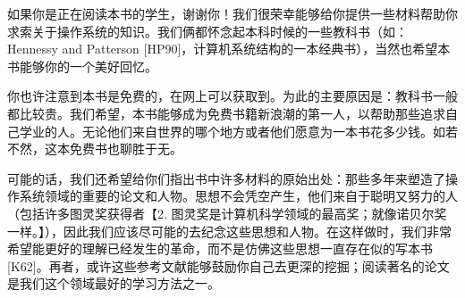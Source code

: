 \vspace*{0.0cm}
\thispagestyle{empty}
\centerline{}\vspace{2cm}

如果你是正在阅读本书的学生，谢谢你！我们很荣幸能够给你提供一些材料帮助你求索关于操作系统的知识。我们俩都怀念起本科时候的一些教科书（如：Hennessy and Patterson [HP90]，计算机系统结构的一本经典书），当然也希望本书能够你的一个美好回忆。

你也许注意到本书是免费的，在网上可以获取到。为此的主要原因是：教科书一般都比较贵。我们希望，本书能够成为免费书籍新浪潮的第一人，以帮助那些追求自己学业的人。无论他们来自世界的哪个地方或者他们愿意为一本书花多少钱。如若不然，这本免费书也聊胜于无。

可能的话，我们还希望给你们指出书中许多材料的原始出处：那些多年来塑造了操作系统领域的重要的论文和人物。思想不会凭空产生，他们来自于聪明又努力的人（包括许多图灵奖获得者【2. 图灵奖是计算机科学领域的最高奖；就像诺贝尔奖一样。】），因此我们应该尽可能的去纪念这些思想和人物。在这样做时，我们非常希望能更好的理解已经发生的革命，而不是仿佛这些思想一直存在似的写本书[K62]。再者，或许这些参考文献能够鼓励你自己去更深的挖掘；阅读著名的论文是我们这个领域最好的学习方法之一。


